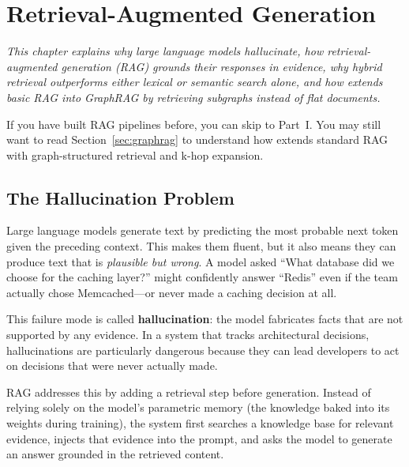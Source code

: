 \chapter{Retrieval-Augmented Generation}
\label{ch:retrieval-augmented-generation}

\textit{This chapter explains why large language models hallucinate, how
retrieval-augmented generation (RAG) grounds their responses in evidence, why
hybrid retrieval outperforms either lexical or semantic search alone, and how
\sysname{} extends basic RAG into GraphRAG by retrieving subgraphs instead of
flat documents.}

\begin{skipahead}
If you have built RAG pipelines before, you can skip to
Part~I\@. You may still want to read Section~\ref{sec:graphrag} to understand
how \sysname{} extends standard RAG with graph-structured retrieval and k-hop
expansion.
\end{skipahead}

\section{The Hallucination Problem}
\label{sec:hallucination}

Large language models generate text by predicting the most probable next token
given the preceding context. This makes them fluent, but it also means they can
produce text that is \emph{plausible but wrong}. A model asked ``What database
did we choose for the caching layer?'' might confidently answer ``Redis'' even
if the team actually chose Memcached---or never made a caching decision at all.

This failure mode is called \textbf{hallucination}: the model fabricates facts
that are not supported by any evidence. In a system that tracks architectural
decisions, hallucinations are particularly dangerous because they can lead
developers to act on decisions that were never actually made.

RAG addresses this by adding a retrieval step before generation. Instead of
relying solely on the model's parametric memory (the knowledge baked into its
weights during training), the system first searches a knowledge base for
relevant evidence, injects that evidence into the prompt, and asks the model to
generate an answer grounded in the retrieved content.

